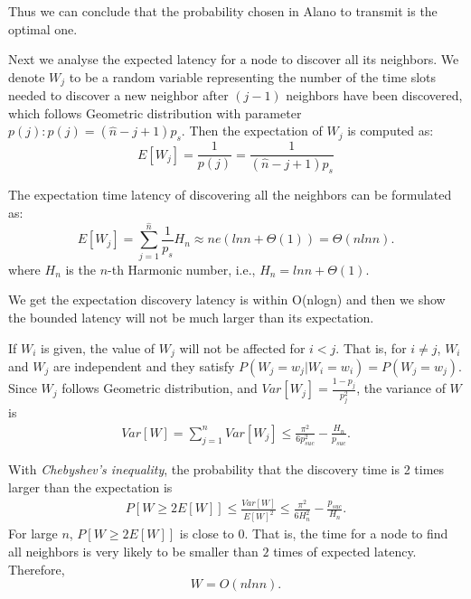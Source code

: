 Thus we can conclude that the probability chosen in Alano
to transmit is the optimal one. 

Next we analyse the expected latency for a node to discover all its 
neighbors. We denote $W_j$ to be a random variable representing the number of the time slots 
needed to discover a new neighbor after $(j-1)$ neighbors have been discovered, which follows 
Geometric distribution with parameter $p(j): p(j)=(\hat{n}-j+1)p_s$. Then the expectation
of $W_j$ is computed as:
$$
E[W_j]=\frac{1}{p(j)}=\frac{1}{(\hat{n}-j+1)p_s}
$$

The expectation time latency of discovering all the neighbors can be formulated as:
$$
E[W_j] = \sum_{j=1}^{\hat{n}}\frac{1}{p_s}H_n \approx ne(lnn + \Theta(1)) = \Theta(nlnn).
$$
where $H_n$ is the $n$-th Harmonic number, i.e.,
$H_n = lnn + \Theta(1)$.

We get the expectation discovery latency is within O(nlogn) and then we
show the bounded latency will not be much larger than its expectation.

If $W_i$ is given, the value of $W_j$ will not be affected for $i<j$. That is, for $i\ne j$, $W_i$ and $W_j$ are independent and they satisfy $P(W_j=w_j|W_i=w_i)=P(W_j=w_j)$. Since $W_j$ follows Geometric distribution, and $Var[W_j]=\frac{1-p_j}{p_j^2}$, the variance of $W$ is
\begin{displaymath}
\begin{split}
 Var[W] %
 =\sum_{j=1}^{n}Var[W_j]
 \le\frac{\pi^2}{6p_{suc}^2}-\frac{H_n}{p_{suc}}.
\end{split}
\end{displaymath}

With \emph{Chebyshev's inequality}, the probability that the discovery time is 2 times larger than the expectation is
\begin{displaymath}
\begin{split}
P[W\ge2E[W]]%
\le\frac{Var[W]}{E[W]^2}
\le\frac{\pi^2}{6H_{n}^2}-\frac{p_{suc}}{H_n}.
\end{split}
\end{displaymath}
For large $n$, $P[W\ge2E[W]]$ is close to 0. That is, the time for a node to find all neighbors is very likely to be smaller than $2$ times of expected latency. Therefore,
\begin{equation*}
W=O(nlnn).
\end{equation*}

